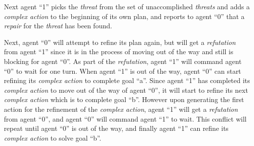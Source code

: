 \documentclass[Main]{subfiles}
\begin{document}
Next agent ``1'' picks the \textit{threat} from the set of unaccomplished
\textit{threats} and adds a \textit{complex action} to the beginning of its own
plan, and reports to agent ``0'' that a \textit{repair} for the \textit{threat}
has been found.

Next, agent ``0'' will attempt to refine its plan again, but will get a
\textit{refutation} from agent ``1'' since it is in the process of moving out of
the way and still is blocking for agent ``0''.
As part of the \textit{refutation}, agent ``1'' will command agent ``0'' to wait for one turn.
When agent ``1'' is out of the way, agent ``0'' can start refining its \textit{complex action} to complete goal ``a''.
Since agent ``1'' has completed its \textit{complex action} to move out of the
way of agent ``0'', it will start to refine its next \textit{complex action} which
is to complete goal ``b''.
However upon generating the first action for the refinement of the
\textit{complex action}, agent ``1'' will get a \textit{refutation} from agent
``0'', and agent ``0'' will command agent ``1'' to wait.
This conflict will repeat until agent ``0'' is out of the way, and finally agent ``1'' can refine its \textit{complex action} to solve goal ``b''.



\end{document}
